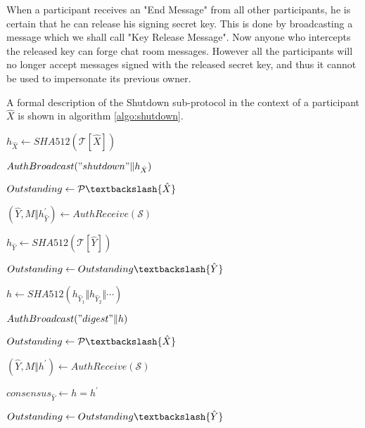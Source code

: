 When a participant receives an "End Message" from all other participants, he is certain that he can release his signing secret key. This is done by broadcasting a message which we shall call "Key Release Message". Now anyone who intercepts the released key can forge chat room messages. However all the participants will no longer accept messages signed with the released secret key, and thus it cannot be used to impersonate its previous owner.

A formal description of the Shutdown sub-protocol in the context of a participant $\hat{X}$ is shown in algorithm \ref{algo:shutdown}.\\

\begin{algorithm}[H]
  \Begin
  {	
    $h_{\hat{X}} \leftarrow SHA512(\mathcal{T}[\hat{X}])$ 
    
    $AuthBroadcast("shutdown" \Vert h_{\hat{X}})$
    
	$Outstanding \leftarrow \mathcal{P} \textbackslash \{\hat{X}\}$

    {
        $(\hat{Y}, M \Vert h_{\hat{Y}}^{'}) \leftarrow AuthReceive(\mathcal{S})$       
        
        {
          $h_{\hat{Y}} \leftarrow SHA512(\mathcal{T}[\hat{Y}])$
        
          $Outstanding \leftarrow Outstanding \textbackslash \{\hat{Y}\}$
        }
    }
    
    $h \leftarrow SHA512(h_{\hat{Y}_1} \Vert h_{\hat{Y}_2} \Vert \cdots)$
    
    $AuthBroadcast("digest" \Vert h)$
    
    $Outstanding \leftarrow \mathcal{P} \textbackslash \{\hat{X}\}$
    
    {
        $(\hat{Y}, M \Vert h^{'}) \leftarrow AuthReceive(\mathcal{S})$
        
        {
          $consensus_{\hat{Y}} \leftarrow h = h^{'}$
        
          $Outstanding \leftarrow Outstanding \textbackslash \{\hat{Y}\}$
        }
    }
    
}
\end{algorithm}
